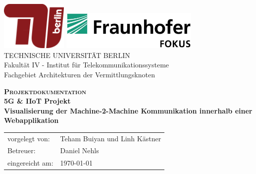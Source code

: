 \documentclass[
	12pt,								%
	DIV10,
	a4paper,         		%
	oneside,						%
	parskip=half,				%
	headings=normal,			%
	listof=totoc,					%
	bibliography=totoc,						%
	index=totoc,						%
	final								%
]{scrartcl}
\newcommand{\nameOfTitel}{Projektdokumentation}
\newcommand{\untertitel}{5G \& IIoT Projekt}	%
\newcommand{\art}{Visualisierung der Machine-2-Machine Kommunikation innerhalb einer Webapplikation}
\newcommand{\autor}{Teham Buiyan und Linh Kästner}
\newcommand{\betreuer}{Daniel Nehls}
\newcommand{\datum}{\today}				%
\begin{document}
\thispagestyle{plain}
\begin{titlepage}

~\vspace{0.5cm} 
\begin{center}
\includegraphics[width = 0.24\textwidth]{tu-logo_rot}\hspace{2cm} 
  		\includegraphics[width=0.5\textwidth]{fokus_Logo_930}\hspace{1cm}\\[1cm]
		\Large{TECHNISCHE UNIVERSITÄT BERLIN}\\
			Fakultät IV - Institut für Telekommunikationssysteme\\
			Fachgebiet Architekturen der Vermittlungsknoten
\end{center}

\vspace{1.2cm}
\begin{center}
\LARGE{\textbf{\textsc{\nameOfTitel}}}\\
\LARGE{\textbf{\untertitel}}\\[2ex]
\Large{\textbf{\art}}\\[8ex]

\normalsize
\begin{tabular}{w{5.4cm}p{8cm}}\\
 vorgelegt von:	 & \quad \autor\\[1.2ex]
 Betreuer: & \quad \betreuer\\[1.2ex]
 eingereicht am: &  \quad \datum\\[3ex]
\end{tabular}
\end{center}

\end{titlepage}
\newpage

\end{document}
